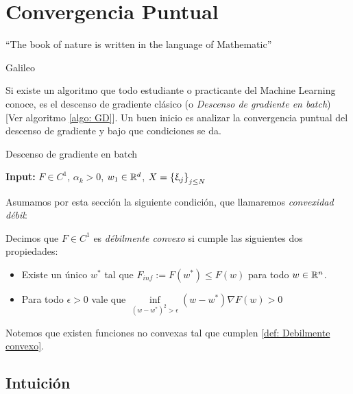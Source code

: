 \chapter{Convergencia Puntual }\label{ch:convergenciaPuntual}

\epigraph{“The book of nature is written in the language of Mathematic”}{Galileo}

Si existe un algoritmo que todo estudiante o practicante del Machine Learning conoce, es el descenso de gradiente cl\'asico (o \textit{Descenso de gradiente en batch}) [Ver algoritmo \ref{algo: GD}].
Un buen inicio es analizar la convergencia puntual del descenso de gradiente y bajo que condiciones se da.

\LinesNumbered
\begin{algorithm}[H]
	\caption{Descenso de gradiente en batch \label{algo: GD}}
	\textbf{Input:} $F \in C^1$, $\alpha_k >0$, $w_1 \in {\mathbb{R}}^d$, $X = \left\lbrace\upxi_j\right\rbrace_{j \leq N}$  \\
\end{algorithm}

Asumamos por esta secci\'on la siguiente condici\'on, que llamaremos \textit{convexidad d\'ebil}:

\begin{definition}
	\label{def: Debilmente convexo}
	Decimos que $F \in C^1$ es \textit{d\'ebilmente convexo} si cumple las siguientes dos propiedades:
	
	\begin{itemize}
		\item Existe un \'unico $w^*$ tal que $F_{inf} := F(w^*) \leq F(w)$ para todo $w \in {\mathbb{R}}^n$.
		\item Para todo $\epsilon > 0$ vale que $\inf\limits_{(w-w^*)^2 > \epsilon} {\left(w - w^*\right) \nabla F(w) > 0}$
	\end{itemize}
	
\end{definition}

\begin{remark}
	Notemos que existen funciones no convexas tal que cumplen \ref{def: Debilmente convexo}.
\end{remark}

\section{Intuici\'on}\label{section: Intuicion convergencia puntual batch}

